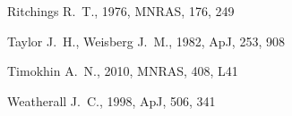 \documentclass[fleqn,usenatbib]{mnras}
\begin{document}
\begin{thebibliography}{99}
{Ritchings} R.~T., 1976, MNRAS, 176, 249

{Taylor} J.~H., {Weisberg} J.~M., 1982, ApJ, 253, 908

{Timokhin} A.~N., 2010, MNRAS, 408, L41

{Weatherall} J.~C., 1998, ApJ, 506, 341

\end{thebibliography}


\bsp    %
\label{lastpage}
\end{document}
